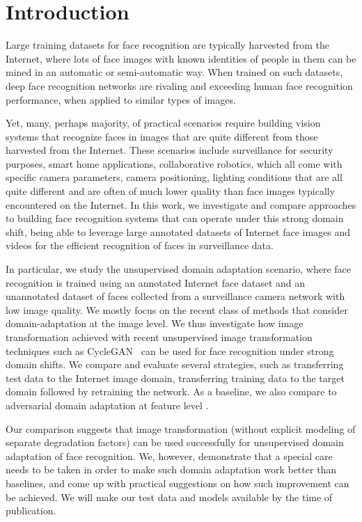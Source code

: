 \section{Introduction}
\label{sect:intro}

Large training datasets for face recognition are typically harvested from the Internet, where lots of face images with known identities of people in them can be mined in an automatic or semi-automatic way. When trained on such datasets, deep face recognition networks are rivaling and exceeding human face recognition performance, when applied to similar types of images. 

Yet, many, perhaps majority, of practical scenarios require building vision systems that recognize faces in images that are quite different from those harvested from the Internet. These scenarios include surveillance for security purposes, smart home applications, collaborative robotics, which all come with specific camera parameters, camera positioning, lighting conditions that are all quite different and are often of much lower quality than face images typically encountered on the Internet. In this work, we investigate and compare approaches to building face recognition systems that can operate under this strong domain shift, being able to leverage large annotated datasets of Internet face images and videos for the efficient recognition of faces in surveillance data. 

In particular, we study the unsupervised domain adaptation scenario, where face recognition is trained using an annotated Internet face dataset and an unannotated dataset of faces collected from a surveillance camera network with low image quality. We mostly focus on the recent class of methods that consider domain-adaptation at the image level. We thus investigate how image transformation achieved with recent unsupervised image transformation techniques such as CycleGAN~\cite{ZhuPIE17} can be used for face recognition under strong domain shifts. We compare and evaluate several strategies, such as transferring test data to the Internet image domain,  transferring training data to the target domain followed by retraining the network. As a baseline, we also compare to adversarial domain adaptation at feature level \cite{GaninUAGLLML16}. 

Our comparison suggests that image transformation (without explicit modeling of separate degradation factors) can be used successfully for unsupervised domain adaptation of face recognition. We, however, demonstrate that a special care needs to be taken in order to make such domain adaptation work better than baselines, and come up with practical suggestions on how such improvement can be achieved. We will make our test data and models available by the time of publication.



